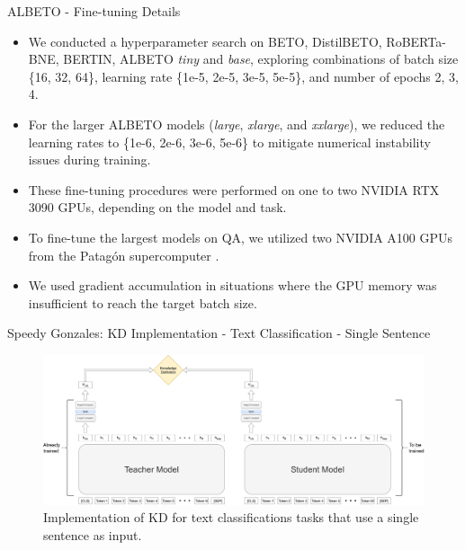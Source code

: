 \documentclass[aspectratio=169,xcolor=dvipsnames]{beamer}
\begin{document}
\begin{frame}{ALBETO - Fine-tuning Details}

\begin{itemize}
    \item We conducted a hyperparameter search on BETO, DistilBETO, RoBERTa-BNE, BERTIN, ALBETO \textit{tiny} and \textit{base}, exploring combinations of batch size \{16, 32, 64\}, learning rate \{1e-5, 2e-5, 3e-5, 5e-5\}, and number of epochs {2, 3, 4}.
    \item For the larger ALBETO models (\textit{large}, \textit{xlarge}, and \textit{xxlarge}), we reduced the learning rates to \{1e-6, 2e-6, 3e-6, 5e-6\} to mitigate numerical instability issues during training. 
    \item These fine-tuning procedures were performed on one to two NVIDIA RTX 3090 GPUs, depending on the model and task.
    \item To fine-tune the largest models on QA, we utilized two NVIDIA A100 GPUs from the Patagón supercomputer \cite{patagon-uach}.
    \item We used gradient accumulation in situations where the GPU memory was insufficient to reach the target batch size.
\end{itemize}

\end{frame}
\begin{frame}{Speedy Gonzales: KD Implementation - Text Classification - Single Sentence}

\begin{figure}
    \centering
    \includegraphics[width=\columnwidth]{images/single-sentence-text-classification-kd.pdf}
    \caption{Implementation of KD for text classifications tasks that use a single sentence as input.}
    \label{fig:single-sentence-text-classification-kd}
\end{figure}

\end{frame}
\end{document}
